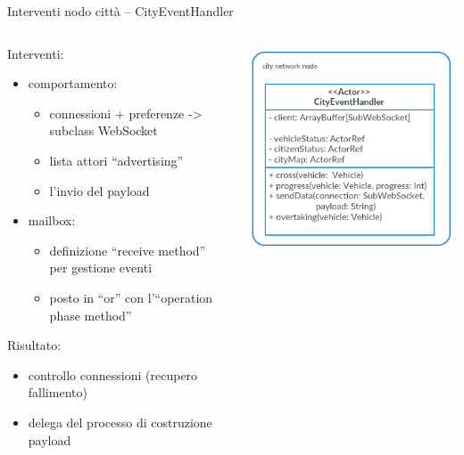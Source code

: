 \begin{frame}{Interventi nodo città -- \scriptsize{CityEventHandler}}
	\begin{columns}
		\begin{column}{0.75\textwidth}
				Interventi:
				\begin{itemize}
					\item{\footnotesize{comportamento:}}
					\begin{itemize}
						\item{\scriptsize{connessioni + preferenze -> subclass WebSocket}}
						\item{\scriptsize{lista attori ``advertising''}}
						\item{\scriptsize{ l'invio del payload}}
					\end{itemize}
					\item{\footnotesize{mailbox:}}
					\begin{itemize}
						\item{\scriptsize{definizione ``receive method'' per gestione eventi}}
						\item{\scriptsize{posto in ``or'' con l'``operation phase method''}}
					\end{itemize}
				\end{itemize}
				Risultato:
				\begin{itemize}
					\item{\footnotesize{controllo connessioni (\tiny{recupero fallimento}\footnotesize{)}}}
					\item{\footnotesize{delega del processo di costruzione payload}}
				\end{itemize}
		\end{column}
		\begin{column}{0.25\textwidth}
			\vspace{15mm}
			\centering
			\includegraphics[scale=0.25]{images/cityEventHandler.png}
		\end{column}
	\end{columns}
\end{frame}

